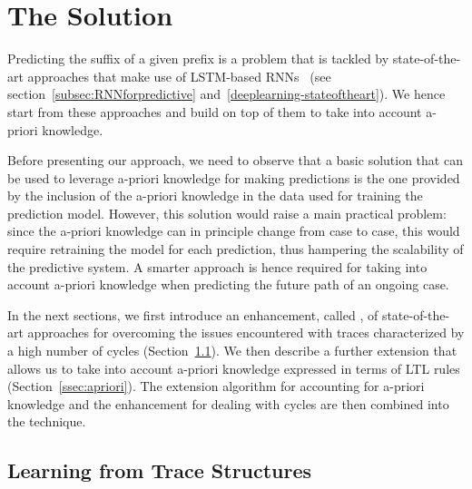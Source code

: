 
\section{The Solution} %
\label{sec:our_approach}

Predicting the suffix of a given prefix is a problem that is tackled by state-of-the-art approaches that make use of LSTM-based RNNs~\cite{evermann,niek96732} (see section~\ref{subsec:RNNforpredictive} and~\ref{deeplearning-stateoftheart}).  We hence start from these approaches and build on top of them to take into account a-priori knowledge.


Before presenting our approach, we need to observe that a basic solution that can be used to leverage a-priori knowledge for making predictions is the one provided by the inclusion of the a-priori knowledge in the data used for training the prediction model.
However, this solution would raise a main practical problem: since the a-priori knowledge can in principle change from case to case, this would require retraining the model for each prediction, thus hampering the scalability of the predictive system. A smarter approach is hence required for taking into account a-priori knowledge when predicting the future path of an ongoing case.

In the next sections, we first introduce an enhancement, called \nocycle, of state-of-the-art approaches for overcoming the issues encountered with traces characterized by a high number of cycles (Section~\ref{ssec:noloop}). We then describe a further extension that allows us to take into account a-priori knowledge expressed in terms of LTL rules (Section~\ref{ssec:apriori}). The extension algorithm for accounting for a-priori knowledge and the enhancement for dealing with cycles are then combined into the \protrack technique.

\subsection{Learning from Trace Structures}
\label{ssec:noloop}

